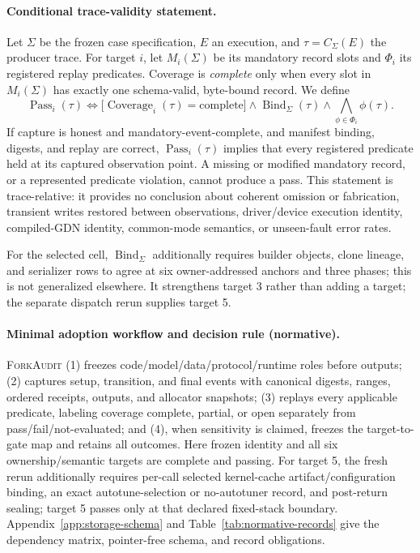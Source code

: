 \documentclass{article}
\newcommand{\method}{\textsc{ForkAudit}}
\begin{document}
\paragraph{Conditional trace-validity statement.}
Let $\Sigma$ be the frozen case specification, $E$ an execution, and
$\tau=C_{\Sigma}(E)$ the producer trace.  For target $i$, let
$M_i(\Sigma)$ be its mandatory record slots and $\Phi_i$ its registered replay
predicates.  Coverage is \emph{complete} only when every slot in
$M_i(\Sigma)$ has exactly one schema-valid, byte-bound record.  We define
\begin{equation}
  \operatorname{Pass}_i(\tau) \Longleftrightarrow
  \bigl[\operatorname{Coverage}_i(\tau)=\mathrm{complete}\bigr]
  \wedge \operatorname{Bind}_{\Sigma}(\tau)
  \wedge \bigwedge_{\phi\in\Phi_i}\phi(\tau).
\end{equation}
If capture is honest and mandatory-event-complete, and manifest binding,
digests, and replay are correct, $\operatorname{Pass}_i(\tau)$ implies that
every registered predicate held at its captured observation point.  A missing
or modified mandatory record, or a represented predicate violation, cannot
produce a pass.  This statement is trace-relative: it provides no conclusion
about coherent omission or fabrication, transient writes restored between
observations, driver/device execution identity, compiled-GDN identity,
common-mode semantics, or unseen-fault error rates.

For the selected cell, $\operatorname{Bind}_{\Sigma}$ additionally requires
builder objects, clone lineage, and serializer rows to agree at six
owner-addressed anchors and three phases; this is not generalized elsewhere.  It strengthens target 3
rather than adding a target; the separate dispatch rerun supplies target 5.

\paragraph{Minimal adoption workflow and decision rule (normative).}
\method{} (1) freezes code/model/data/protocol/runtime roles before outputs;
(2) captures setup, transition, and final events with canonical digests,
ranges, ordered receipts, outputs, and allocator snapshots; (3) replays every
applicable predicate, labeling coverage complete, partial, or open separately
from pass/fail/not-evaluated; and (4), when sensitivity is claimed, freezes the
target-to-gate map and retains all outcomes.  Here frozen identity and all six
ownership/semantic targets are complete and passing.  For target 5, the fresh
rerun additionally requires per-call selected kernel-cache
artifact/configuration binding, an exact autotune-selection or no-autotuner
record, and post-return sealing;
target 5 passes only at that declared fixed-stack boundary.
Appendix~\ref{app:storage-schema} and Table~\ref{tab:normative-records} give the
dependency matrix, pointer-free schema, and record obligations.
\end{document}
